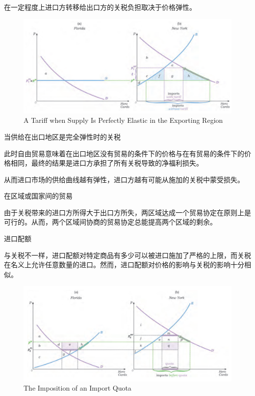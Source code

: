 \documentclass{article}
\begin{document}
在一定程度上进口方转移给出口方的关税负担取决于价格弹性。

\begin{figure}[H] %
	\centering %
	\includegraphics[width=1\textwidth]{20_4} %
	\caption{A Tariff when Supply Is Perfectly Elastic in the Exporting Region} %
	\label{Fig.main5} %
\end{figure}

当供给在出口地区是完全弹性时的关税

此时自由贸易意味着在出口地区没有贸易的条件下的价格与在有贸易的条件下的价格相同，最终的结果是进口方承担了所有关税导致的净福利损失。

从而进口市场的供给曲线越有弹性，进口方越有可能从施加的关税中蒙受损失。

\hspace*{\fill}

在区域或国家间的贸易

由于关税带来的进口方所得大于出口方所失，两区域达成一个贸易协定在原则上是可行的。从而，两个区域间协商的贸易协定总能提高两个区域的剩余。

\hspace*{\fill}

进口配额

与关税不一样，进口配额对特定商品有多少可以被进口施加了严格的上限，而关税在名义上允许任意数量的进口。然而，进口配额对价格的影响与关税的影响十分相似。 

\begin{figure}[H] %
	\centering %
	\includegraphics[width=1\textwidth]{20_5} %
	\caption{The Imposition of an Import Quota} %
	\label{Fig.main6} %
\end{figure}
\end{document}
